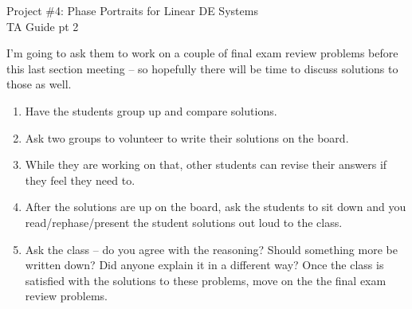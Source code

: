 \documentclass[epsf]{article}
\begin{document}
\newcommand{\R}{\mathbb{R}}
\newcommand{\noi}{\noindent}
\newcommand{\bs}{\bigskip}

\newenvironment{spaced_item}{
\begin{itemize}
  \setlength{\itemsep}{5pt}
  \setlength{\parskip}{10pt}
  \setlength{\parsep}{10pt}
}{\end{itemize}}



\begin{center}
{\Large Project \#4: Phase Portraits for Linear DE Systems\\
\vskip 2mm
TA Guide pt 2}
\end{center}

\noi{\bf 1. } I'm going to ask them to work on a couple of final exam review problems before this last section meeting -- so hopefully there will be time to discuss solutions to those as well. 
\begin{enumerate}
\item Have the students group up and compare solutions.  
\item Ask two groups to volunteer to write their solutions on the board.  
\item While they are working on that, other students can revise their answers if they feel they need to.  
\item After the solutions are up on the board, ask the students to sit down and you read/rephase/present the student solutions out loud to the class.  
\item Ask the class -- do you agree with the reasoning?  Should something more be written down?  Did anyone explain it in a different way?  Once the class is satisfied with the solutions to these problems, move on the the final exam review problems.
\end{enumerate}
\end{document}
